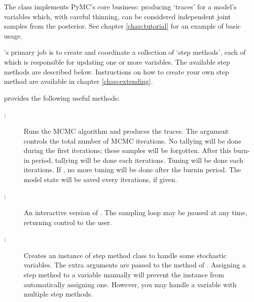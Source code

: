 The  class implements PyMC's core business: producing `traces' for a model's variables which, with careful thinning, can be considered independent joint samples from the posterior. See chapter \ref{chap:tutorial} for an example of basic usage.

's primary job is to create and coordinate a collection of `step methods', each of which is responsible for updating one or more variables. The available step methods are described below. Instructions on how to create your own step method are available in chapter \ref{chap:extending}.

 provides the following useful methods:
\begin{description}
    \item[:] Runs the MCMC algorithm and produces the traces. The  argument controls the total number of MCMC iterations. No tallying will be done during the first  iterations; these samples will be forgotten. After this burn-in period, tallying will be done each  iterations. Tuning will be done each  iterations. If , no more tuning will be done after the burnin period. The model state will be saved every  iterations, if given.
    \item[:] An interactive version of . The sampling loop may be paused at any time, returning control to the user.
    \item[:] Creates an instance of step method class  to handle some stochastic variables. The extra arguments are passed to the  method of . Assigning a step method to a variable manually will prevent the  instance from automatically assigning one. However, you may handle a variable with multiple step methods.


\end{description}

